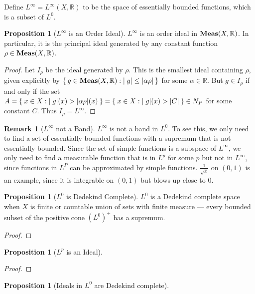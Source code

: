 \documentclass[letterpaper,10pt,oneside,onecolumn,reqno]{amsart}
\newcommand{\R}{\mathbb R}
\theoremstyle{definition}
\newtheorem{pro}[thm]{Proposition}
\newtheorem{rem}{Remark}
\newcommand{\catname}[1]{{\normalfont\textbf{#1}}}
\newcommand{\Meas}{\catname{Meas}}
\begin{document}
Define $L^{\infty}=L^{\infty}(X,\R)$ to be the space of essentially
bounded functions, which is a subset of $L^0$.

\begin{pro}[$L^{\infty}$ is an Order Ideal]\label{pro:4}
  $L^{\infty}$ is an order ideal in $\Meas(X,\R)$. In particular, it
  is the principal ideal generated by any constant function $\rho \in
  \Meas(X,\R)$.
\end{pro}

\begin{proof}
  Let $I_{\rho}$ be the ideal generated by $\rho$. This is the
  smallest ideal containing $\rho$, given explicitly by $\Set{g \in
    \Meas(X, \R) : |g| \leq |\alpha \rho|}$ for some $\alpha \in
  \R$. But $g \in I_{\rho}$ if and only if the set $A = \Set{x \in X :
    |g|(x) > |\alpha \rho|(x)} = \Set{x \in X : |g|(x) > |C|} \in N_P$
  for some constant $C$. Thus $I_{\rho} = L^{\infty}$.
\end{proof}

\begin{rem}[$L^{\infty}$ not a Band]\label{rem:5}
  $L^{\infty}$ is not a band in $L^0$. To see this, we only
  need to find a set of essentially bounded functions with a supremum
  that is not essentially bounded. Since the set of simple functions
  is a subspace of $L^{\infty}$, we only need to find a measurable
  function that is in $L^p$ for some $p$ but not in $L^{\infty}$,
  since functions in $L^P$ can be approximated by simple
  functions. $\frac{1}{\sqrt{x}}$ on $(0,1)$ is an example, since it
  is integrable on $(0,1)$ but blows up close to $0$. 
\end{rem}

\begin{pro}[$L^{0}$ is Dedekind Complete]\label{pro:5}
$L^{0}$ is a Dedekind complete space when $X$ is finite or countable
union of sets with finite measure --- every bounded subset of the
positive cone $(L^0)^+$ has a supremum. 
\end{pro}

\begin{proof}
\end{proof}

\begin{pro}[$L^{p}$ is an Ideal]
\end{pro}

\begin{proof}
\end{proof}

\begin{pro}[Ideals in $L^0$ are Dedekind complete]
\end{pro}
\end{document}
